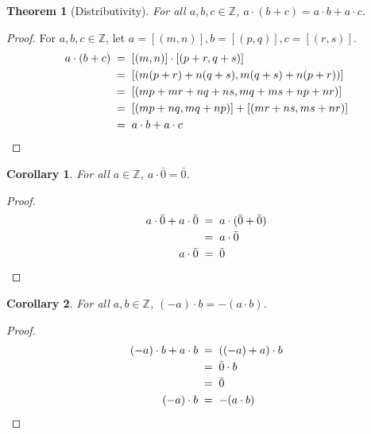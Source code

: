 \documentclass[10pt]{article}
\newtheorem{theorem}{Theorem}[section]
\newtheorem{corollary}{Corollary}[theorem]
\theoremstyle{definition}
\theoremstyle{remark}
\begin{document}
        \begin{theorem}[Distributivity]
                For all $a,b,c \in \mathbb{Z}$, $a\cdot(b + c) = a\cdot b + a\cdot c$.
        \end{theorem}
        \begin{proof}
                For $a,b,c \in \mathbb{Z}$, let $a = [(m, n)], b = [(p, q)], c = [(r, s)]$.
                \begin{align*}
                        a\cdot (b + c) \;&=\; [(m, n)] \cdot [(p + r, q + s)] \\
                                \;&=\; [(m(p + r) + n(q + s), m(q + s) + n(p + r))] \\
                                \;&=\; [(mp + mr + nq + ns, mq + ms + np + nr)] \\
                                \;&=\; [(mp + nq, mq + np)] + [(mr + ns, ms + nr)] \\
                                \;&=\; a\cdot b + a\cdot c \qedhere
                \end{align*}
        \end{proof}
        \begin{corollary}
                For all $a \in \mathbb{Z}$, $a\cdot \bar{0} = \bar{0}$.
        \end{corollary}
        \begin{proof}
                \begin{align*}
                        a\cdot \bar{0} + a\cdot\bar{0} \;&=\; a\cdot (\bar{0} + \bar{0}) \\
                                \;&=\; a\cdot\bar{0} \\
                        a\cdot \bar{0} \;&=\; \bar{0} \qedhere
                \end{align*}
        \end{proof}
        \begin{corollary}
                For all $a, b \in \mathbb{Z}$, $(-a)\cdot b = -(a\cdot b)$.
        \end{corollary}
        \begin{proof}
                \begin{align*}
                        (-a)\cdot b + a\cdot b \;&=\; ((-a) + a)\cdot b \\
                                \;&=\; \bar{0} \cdot b \\
                                \;&=\; \bar{0}\\
                        (-a)\cdot b \;&=\; -(a\cdot b) \qedhere
                \end{align*}
        \end{proof}
\end{document}
